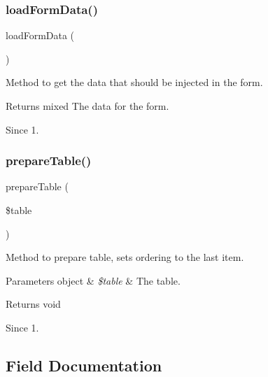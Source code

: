 \subsubsection{load\+Form\+Data()}
{\footnotesize\ttfamily load\+Form\+Data (\begin{DoxyParamCaption}{ }\end{DoxyParamCaption})\hspace{0.3cm}{\ttfamily [protected]}}

Method to get the data that should be injected in the form.

\begin{DoxyReturn}{Returns}
mixed The data for the form.
\end{DoxyReturn}
\begin{DoxySince}{Since}
1. 
\end{DoxySince}
\mbox{\label{classtks__agenda_model_recuritem_a2ea87ee03f5fa9e722ef459c93d69874}} 
\subsubsection{prepare\+Table()}
{\footnotesize\ttfamily prepare\+Table (\begin{DoxyParamCaption}\item[{}]{\$table }\end{DoxyParamCaption})\hspace{0.3cm}{\ttfamily [protected]}}

Method to prepare table, sets ordering to the last item.


\begin{DoxyParams}[1]{Parameters}
object & {\em \$table} & The table.\\
\hline
\end{DoxyParams}
\begin{DoxyReturn}{Returns}
void
\end{DoxyReturn}
\begin{DoxySince}{Since}
1. 
\end{DoxySince}


\subsection{Field Documentation}
\mbox{\label{classtks__agenda_model_recuritem_aa61b415cee119a7511e05c405ecd0b32}} 
